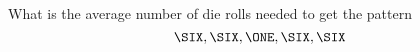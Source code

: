 What is the average number of die rolls needed to
get the pattern
\[
\SIX, \SIX, \ONE, \SIX, \SIX 
\]
